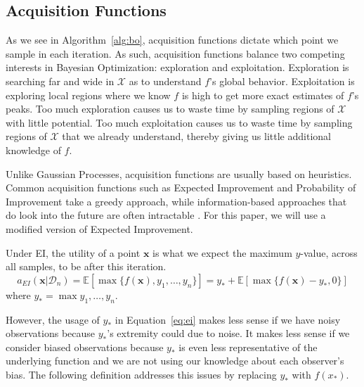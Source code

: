 \subsection{Acquisition Functions}
As we see in Algorithm~\ref{alg:bo}, acquisition functions dictate which point we sample in each iteration.
As such, acquisition functions balance two competing interests in Bayesian Optimization: exploration and exploitation.
Exploration is searching far and wide in $\mathcal{X}$ as to understand $f$'s global behavior.
Exploitation is exploring local regions where we know $f$ is high to get more exact estimates of $f$'s peaks.
Too much exploration causes us to waste time by sampling regions of $\mathcal{X}$ with little potential.
Too much exploitation causes us to waste time by sampling regions of $\mathcal{X}$ that we already understand, thereby giving us little additional knowledge of $f$.

Unlike Gaussian Processes, acquisition functions are usually based on heuristics.
Common acquisition functions such as Expected Improvement and Probability of Improvement take a greedy approach, while information-based approaches that do look into the future are often intractable \cite{shahriari2016}.
For this paper, we will use a modified version of Expected Improvement.

Under EI, the utility of a point $\mathbf{x}$ is what we expect the maximum $y$-value,
across all samples, to be after this iteration.
\begin{equation}
    \label{eq:ei}
    a_{EI}(\mathbf{x} | \mathcal{D}_n) = \mathbb{E}[\max\{f(\mathbf{x}), y_1, \dots, y_n\}]
    = y_* + \mathbb{E}[\max\{f(\mathbf{x}) - y_*, 0\}]
\end{equation}
where $y_* = \max{y_1, \dots, y_n}$.

However, the usage of $y_*$ in Equation~\ref{eq:ei} makes less sense if we have noisy observations because $y_*$'s extremity could due to noise.
It makes less sense if we consider biased observations because $y_*$ is even less representative of the underlying function and we are not using our knowledge about each observer's bias.
The following definition addresses this issues by replacing $y_*$ with $f(x_*)$.

